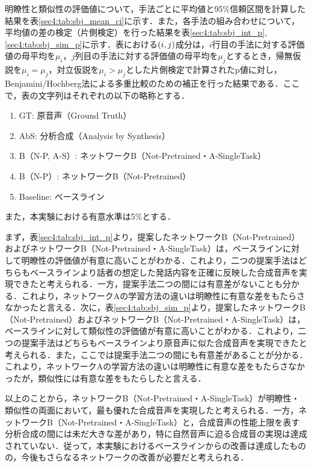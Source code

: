 \documentclass[12pt]{jarticle}
\numberwithin{equation}{section}    %
\numberwithin{figure}{section}      %
\numberwithin{table}{section}      %
\begin{document}
明瞭性と類似性の評価値について，手法ごとに平均値と95\%信頼区間を計算した結果を表\ref{sec4:tab:sbj_mean_ci}に示す．また，各手法の組み合わせについて，平均値の差の検定（片側検定）を行った結果を表\ref{sec4:tab:sbj_int_p}, \ref{sec4:tab:sbj_sim_p}に示す．表における$\left(i, j\right)$成分は，$i$行目の手法に対する評価値の母平均を$\mu_{i}$，$j$列目の手法に対する評価値の母平均を$\mu_{j}$とするとき，帰無仮説を$\mu_{i} = \mu_{j}$，対立仮説を$\mu_{i} > \mu_{j}$とした片側検定で計算されたp値に対し，Benjamini/Hochberg法による多重比較のための補正を行った結果である．ここで，表の文字列はそれぞれの以下の略称とする．
\begin{enumerate}
    \item GT: 原音声（Ground Truth）
    \item AbS: 分析合成（Analysis by Synthesis）
    \item B（N-P, A-S）: ネットワークB（Not-Pretrained・A-SingleTask）
    \item B（N-P）: ネットワークB（Not-Pretrained）
    \item Baseline: ベースライン
\end{enumerate}
また，本実験における有意水準は5\%とする．

まず，表\ref{sec4:tab:sbj_int_p}より，提案したネットワークB（Not-Pretrained）およびネットワークB（Not-Pretrained・A-SingleTask）は，ベースラインに対して明瞭性の評価値が有意に高いことがわかる．これより，二つの提案手法はどちらもベースラインより話者の想定した発話内容を正確に反映した合成音声を実現できたと考えられる．一方，提案手法二つの間には有意差がないことも分かる．これより，ネットワークAの学習方法の違いは明瞭性に有意な差をもたらさなかったと言える．次に，表\ref{sec4:tab:sbj_sim_p}より，提案したネットワークB（Not-Pretrained）およびネットワークB（Not-Pretrained・A-SingleTask）は，ベースラインに対して類似性の評価値が有意に高いことがわかる．これより，二つの提案手法はどちらもベースラインより原音声に似た合成音声を実現できたと考えられる．また，ここでは提案手法二つの間にも有意差があることが分かる．これより，ネットワークAの学習方法の違いは明瞭性に有意な差をもたらさなかったが，類似性には有意な差をもたらしたと言える．

以上のことから，ネットワークB（Not-Pretrained・A-SingleTask）が明瞭性・類似性の両面において，最も優れた合成音声を実現したと考えられる．一方，ネットワークB（Not-Pretrained・A-SingleTask）と，合成音声の性能上限を表す分析合成の間には未だ大きな差があり，特に自然音声に迫る合成音の実現は達成されていない．従って，本実験におけるベースラインからの改善は達成したものの，今後もさらなるネットワークの改善が必要だと考えられる．
\end{document}
